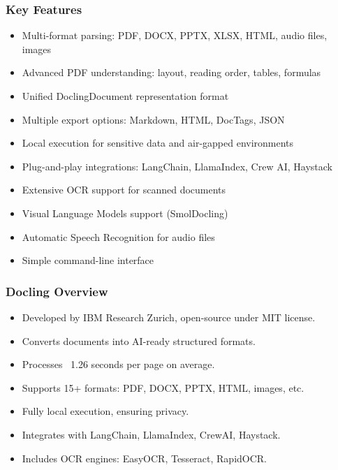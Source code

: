 \begin{frame}[fragile]\frametitle{Key Features}
      \begin{itemize}
	\item Multi-format parsing: PDF, DOCX, PPTX, XLSX, HTML, audio files, images
	\item Advanced PDF understanding: layout, reading order, tables, formulas
	\item Unified DoclingDocument representation format
	\item Multiple export options: Markdown, HTML, DocTags, JSON
	\item Local execution for sensitive data and air-gapped environments
	\item Plug-and-play integrations: LangChain, LlamaIndex, Crew AI, Haystack
	\item Extensive OCR support for scanned documents
	\item Visual Language Models support (SmolDocling)
	\item Automatic Speech Recognition for audio files
	\item Simple command-line interface
	  \end{itemize}
\end{frame}

\begin{frame}[fragile]\frametitle{Docling Overview}
      \begin{itemize}
        \item Developed by IBM Research Zurich, open-source under MIT license.
        \item Converts documents into AI-ready structured formats.
        \item Processes ~1.26 seconds per page on average.
        \item Supports 15+ formats: PDF, DOCX, PPTX, HTML, images, etc.
        \item Fully local execution, ensuring privacy.
        \item Integrates with LangChain, LlamaIndex, CrewAI, Haystack.
        \item Includes OCR engines: EasyOCR, Tesseract, RapidOCR.
      \end{itemize}
\end{frame}

